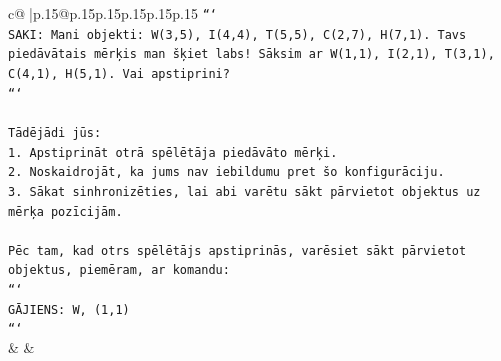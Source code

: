 \documentclass{article}
\begin{document}
{\begin{supertabular}{c@{$\;$}|p{.15\linewidth}@{}p{.15\linewidth}p{.15\linewidth}p{.15\linewidth}p{.15\linewidth}p{.15\linewidth}}
{{{\texttt{```} \\
\texttt{SAKI: Mani objekti: W(3,5), I(4,4), T(5,5), C(2,7), H(7,1). Tavs piedāvātais mērķis man šķiet labs! Sāksim ar W(1,1), I(2,1), T(3,1), C(4,1), H(5,1). Vai apstiprini?} \\
\texttt{```} \\
\\ 
\texttt{Tādējādi jūs:} \\
\texttt{1. Apstiprināt otrā spēlētāja piedāvāto mērķi.} \\
\texttt{2. Noskaidrojāt, ka jums nav iebildumu pret šo konfigurāciju.} \\
\texttt{3. Sākat sinhronizēties, lai abi varētu sākt pārvietot objektus uz mērķa pozīcijām.} \\
\\ 
\texttt{Pēc tam, kad otrs spēlētājs apstiprinās, varēsiet sākt pārvietot objektus, piemēram, ar komandu:} \\
\texttt{```} \\
\texttt{GĀJIENS: W, (1,1)} \\
\texttt{```} \\
            }
        }
    }
    & & \\ \\


\end{supertabular}}
\end{document}
